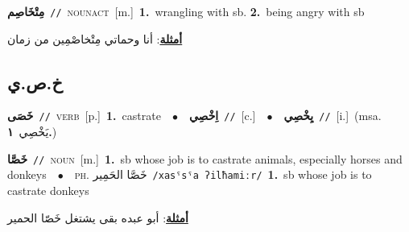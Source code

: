 \documentclass[10pt,a4paper,twoside]{article} %
\begin{document}
\begin{multicols}{2}
{\setlength\topsep{0pt}\textbf{\foreignlanguage{arabic}{مِتْخَاصِم}}\ {\color{gray}\texttt{//}\color{black}}\ \textsc{noun\textunderscore act}\ [m.]\ \textbf{1.}~wrangling with sb.  \textbf{2.}~being angry with sb\  \begin{flushright}\color{gray}\foreignlanguage{arabic}{\textbf{\underline{\foreignlanguage{arabic}{أمثلة}}}: أنا وحماتي مِتْخاصْمِين من زمان}\end{flushright}\color{black}} \vspace{2mm}

\vspace{-3mm}
\subsection*{\color{blue}\foreignlanguage{arabic}{خ.ص.ي}\color{blue}{}} 

{\setlength\topsep{0pt}\textbf{\foreignlanguage{arabic}{خَصَى}}\ {\color{gray}\texttt{//}\color{black}}\ \textsc{verb}\ [p.]\ \textbf{1.}~castrate\ \ $\bullet$\ \ \setlength\topsep{0pt}\textbf{\foreignlanguage{arabic}{اِخْصِي}}\ {\color{gray}\texttt{//}\color{black}}\ [c.]\ \ $\bullet$\ \ \setlength\topsep{0pt}\textbf{\foreignlanguage{arabic}{يِخْصِي}}\ {\color{gray}\texttt{//}\color{black}}\ [i.]\ \color{gray}(msa. \foreignlanguage{arabic}{يَخْصِي}~\foreignlanguage{arabic}{\textbf{١.}})\color{black}\ } \vspace{2mm}

{\setlength\topsep{0pt}\textbf{\foreignlanguage{arabic}{خَصَّا}}\ {\color{gray}\texttt{//}\color{black}}\ \textsc{noun}\ [m.]\ \textbf{1.}~sb whose job is to castrate animals, especially horses and donkeys\ \ $\bullet$\ \ \textsc{ph.} \color{gray} \foreignlanguage{arabic}{خَصَّا الحَمِير}\color{black}\ {\color{gray}\texttt{/{\sffamily xasˤsˤa ʔilħamiːr}/}\color{black}}\ \textbf{1.}~sb whose job is to castrate donkeys\  \begin{flushright}\color{gray}\foreignlanguage{arabic}{\textbf{\underline{\foreignlanguage{arabic}{أمثلة}}}: أبو عبده بقى يشتغل خَصّا الحمير}\end{flushright}\color{black}} \vspace{2mm}


\end{multicols}
\end{document}
